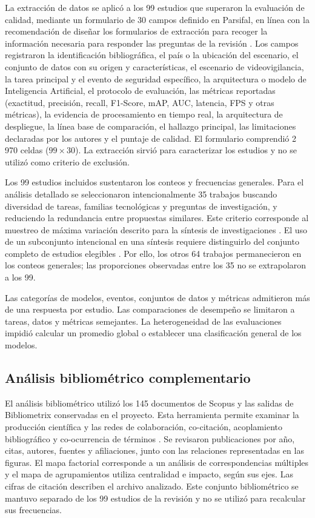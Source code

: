 \documentclass[pdflatex,sn-mathphys-num]{sn-jnl}%
\theoremstyle{thmstyleone}%
\theoremstyle{thmstyletwo}%
\theoremstyle{thmstylethree}%
\begin{document}
La extracción de datos se aplicó a los 99 estudios que superaron la evaluación de calidad, mediante un formulario de 30 campos definido en Parsifal, en línea con la recomendación de diseñar los formularios de extracción para recoger la información necesaria para responder las preguntas de la revisión \cite{kitchenham2007}. Los campos registraron la identificación bibliográfica, el país o la ubicación del escenario, el conjunto de datos con su origen y características, el escenario de videovigilancia, la tarea principal y el evento de seguridad específico, la arquitectura o modelo de Inteligencia Artificial, el protocolo de evaluación, las métricas reportadas (exactitud, precisión, recall, F1-Score, mAP, AUC, latencia, FPS y otras métricas), la evidencia de procesamiento en tiempo real, la arquitectura de despliegue, la línea base de comparación, el hallazgo principal, las limitaciones declaradas por los autores y el puntaje de calidad. El formulario comprendió 2\,970 celdas ($99 \times 30$). La extracción sirvió para caracterizar los estudios y no se utilizó como criterio de exclusión.

Los 99 estudios incluidos sustentaron los conteos y frecuencias generales. Para el análisis detallado se seleccionaron intencionalmente 35 trabajos buscando diversidad de tareas, familias tecnológicas y preguntas de investigación, y reduciendo la redundancia entre propuestas similares. Este criterio corresponde al muestreo de máxima variación descrito para la síntesis de investigaciones \cite{suri2011}. El uso de un subconjunto intencional en una síntesis requiere distinguirlo del conjunto completo de estudios elegibles \cite{ames2019}. Por ello, los otros 64 trabajos permanecieron en los conteos generales; las proporciones observadas entre los 35 no se extrapolaron a los 99.

Las categorías de modelos, eventos, conjuntos de datos y métricas admitieron más de una respuesta por estudio. Las comparaciones de desempeño se limitaron a tareas, datos y métricas semejantes. La heterogeneidad de las evaluaciones impidió calcular un promedio global o establecer una clasificación general de los modelos.

\subsection{Análisis bibliométrico complementario}\label{subsec:biblio_method}

El análisis bibliométrico utilizó los 145 documentos de Scopus y las salidas de Bibliometrix conservadas en el proyecto. Esta herramienta permite examinar la producción científica y las redes de colaboración, co-citación, acoplamiento bibliográfico y co-ocurrencia de términos \cite{aria2017}. Se revisaron publicaciones por año, citas, autores, fuentes y afiliaciones, junto con las relaciones representadas en las figuras. El mapa factorial corresponde a un análisis de correspondencias múltiples y el mapa de agrupamientos utiliza centralidad e impacto, según sus ejes. Las cifras de citación describen el archivo analizado. Este conjunto bibliométrico se mantuvo separado de los 99 estudios de la revisión y no se utilizó para recalcular sus frecuencias.
\end{document}
